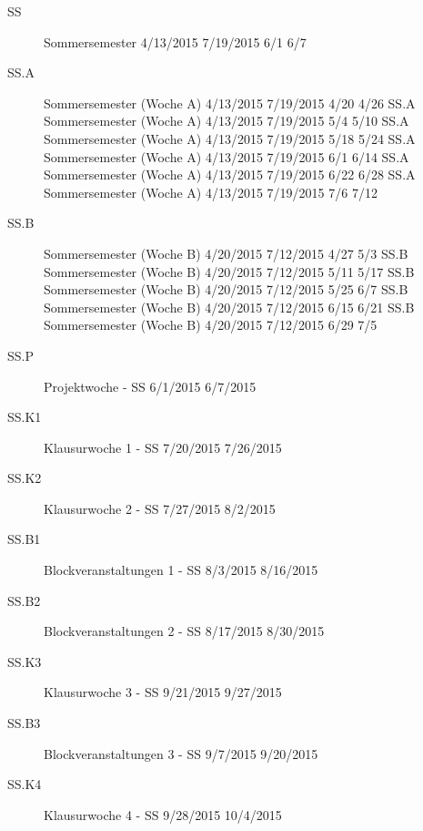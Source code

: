 \documentclass[]{report}
\begin{document}
\begin{appendices}
\begin{description}
	\item[SS] Sommersemester	4/13/2015	7/19/2015  6/1	6/7
	\item[SS.A] Sommersemester (Woche A)	4/13/2015	7/19/2015 4/20	4/26
		SS.A	Sommersemester (Woche A)	4/13/2015	7/19/2015 5/4	5/10
		SS.A	Sommersemester (Woche A)	4/13/2015	7/19/2015 5/18	5/24
		SS.A	Sommersemester (Woche A)	4/13/2015	7/19/2015 6/1	6/14
		SS.A	Sommersemester (Woche A)	4/13/2015	7/19/2015 6/22	6/28
		SS.A	Sommersemester (Woche A)	4/13/2015	7/19/2015 7/6	7/12
	\item[SS.B]	Sommersemester (Woche B)	4/20/2015	7/12/2015 4/27	5/3
		SS.B	Sommersemester (Woche B)	4/20/2015	7/12/2015 5/11	5/17
		SS.B	Sommersemester (Woche B)	4/20/2015	7/12/2015 5/25	6/7
		SS.B	Sommersemester (Woche B)	4/20/2015	7/12/2015 6/15	6/21
		SS.B	Sommersemester (Woche B)	4/20/2015	7/12/2015 6/29	7/5
	\item[SS.P]	Projektwoche - SS	6/1/2015	6/7/2015	 	 	 	
	\item[SS.K1]	Klausurwoche 1 - SS	7/20/2015	7/26/2015	 	 	 	
	\item[SS.K2]	Klausurwoche 2 - SS	7/27/2015	8/2/2015	 	 	 	
	\item[SS.B1]	Blockveranstaltungen 1 - SS	8/3/2015	8/16/2015
	\item[SS.B2]	Blockveranstaltungen 2 - SS	8/17/2015	8/30/2015
	\item[SS.K3]	Klausurwoche 3 - SS	9/21/2015	9/27/2015	 	 	 	
	\item[SS.B3]	Blockveranstaltungen 3 - SS	9/7/2015	9/20/2015
	\item[SS.K4]	Klausurwoche 4 - SS	9/28/2015	10/4/2015 	 	 	
		
\end{description}

	
\end{appendices}
\end{document}
